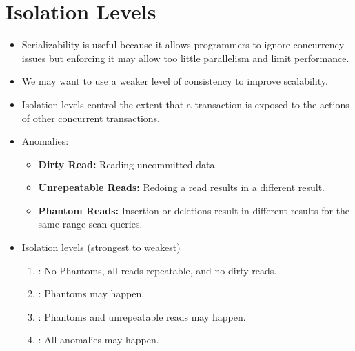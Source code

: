 \documentclass[11pt]{article}
\begin{document}
\section{Isolation Levels}
\begin{itemize}
    \item
    Serializability is useful because it allows programmers to ignore concurrency issues but 
    enforcing it may allow too little parallelism and limit performance.
    
    \item
    We may want to use a weaker level of consistency to improve scalability.
    
    \item 
    Isolation levels control the extent that a transaction is exposed to the actions of other 
    concurrent transactions.
    
    \item Anomalies:
    \begin{itemize}
        \item \textbf{Dirty Read:}
        Reading uncommitted data.
        
        \item \textbf{Unrepeatable Reads:}
        Redoing a read results in a different result.
        
        \item \textbf{Phantom Reads:}
        Insertion or deletions result in different results for 
        the same range scan queries.
    \end{itemize}
    
    \item Isolation levels (strongest to weakest)
    \begin{enumerate}
        \item {}:
        No Phantoms, all reads repeatable, and no dirty reads.
        
        \item {}:
        Phantoms may happen.
        
        \item {}:
        Phantoms and unrepeatable reads may happen.
        
        \item {}:
        All anomalies may happen.
    \end{enumerate}
    

\end{itemize}
\end{document}
